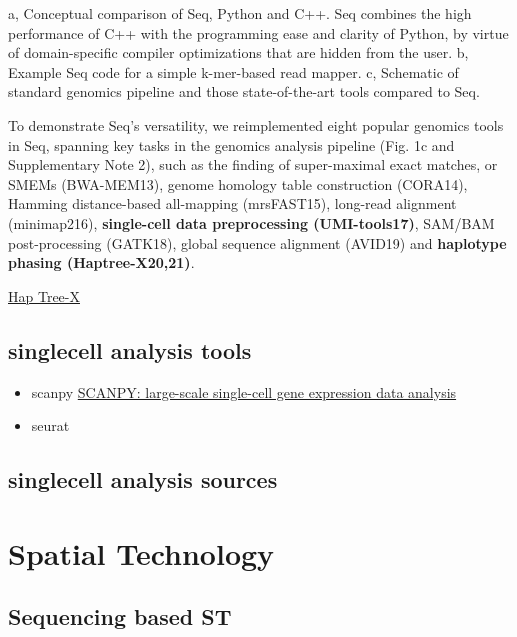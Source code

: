 \documentclass[
]{book}
\begin{document}
a, Conceptual comparison of Seq, Python and C++. Seq combines the high performance of C++ with the programming ease and clarity of Python, by virtue of domain-specific compiler optimizations that are hidden from the user. b, Example Seq code for a simple k-mer-based read mapper. c, Schematic of standard genomics pipeline and those state-of-the-art tools compared to Seq.

To demonstrate Seq's versatility, we reimplemented eight popular genomics tools in Seq, spanning key tasks in the genomics analysis pipeline (Fig. 1c and Supplementary Note 2), such as the finding of super-maximal exact matches, or SMEMs (BWA-MEM13), genome homology table construction (CORA14), Hamming distance-based all-mapping (mrsFAST15), long-read alignment (minimap216), \textbf{single-cell data preprocessing (UMI-tools17)}, SAM/BAM post-processing (GATK18), global sequence alignment (AVID19) and \textbf{haplotype phasing (Haptree-X20,21)}.

\href{https://github.com/seq-lang/seq-benchmarks/tree/master/seq-nbt\#haptree-x-haplotype-phasing}{Hap Tree-X}

\hypertarget{singlecell-analysis-tools}{%
\section{singlecell analysis tools}\label{singlecell-analysis-tools}}

\begin{itemize}
\item
  scanpy
  \href{https://genomebiology.biomedcentral.com/articles/10.1186/s13059-017-1382-0}{SCANPY: large-scale single-cell gene expression data analysis}
\item
  seurat
\end{itemize}

\hypertarget{singlecell-analysis-sources}{%
\section{singlecell analysis sources}\label{singlecell-analysis-sources}}

\hypertarget{spatial-technology}{%
\chapter{Spatial Technology}\label{spatial-technology}}

\hypertarget{sequencing-based-st}{%
\section{Sequencing based ST}\label{sequencing-based-st}}
\end{document}
